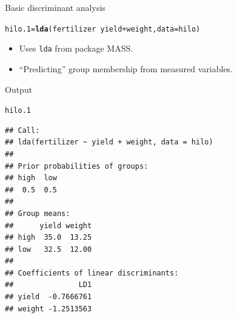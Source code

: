 \documentclass[unknownkeysallowed]{beamer}\usepackage[]{graphicx}\usepackage[]{color}
\makeatletter
\newcommand{\hlopt}[1]{\textcolor[rgb]{0,0,0}{#1}}%
\newcommand{\hlstd}[1]{\textcolor[rgb]{0.345,0.345,0.345}{#1}}%
\newcommand{\hlkwb}[1]{\textcolor[rgb]{0.69,0.353,0.396}{#1}}%
\newcommand{\hlkwc}[1]{\textcolor[rgb]{0.333,0.667,0.333}{#1}}%
\newcommand{\hlkwd}[1]{\textcolor[rgb]{0.737,0.353,0.396}{\textbf{#1}}}%
\newenvironment{kframe}{%
 \def\at@end@of@kframe{}%
 \ifinner\ifhmode%
  \def\at@end@of@kframe{\end{minipage}}%
  \begin{minipage}{\columnwidth}%
 \fi\fi%
 \def\FrameCommand##1{\hskip\@totalleftmargin \hskip-\fboxsep
 \colorbox{shadecolor}{##1}\hskip-\fboxsep
     \hskip-\linewidth \hskip-\@totalleftmargin \hskip\columnwidth}%
 \MakeFramed {\advance\hsize-\width
   \@totalleftmargin\z@ \linewidth\hsize
   \@setminipage}}%
 {\par\unskip\endMakeFramed%
 \at@end@of@kframe}
\newenvironment{knitrout}{}{} %
\makeatother
\begin{document}
\begin{frame}[fragile]{Basic discriminant analysis}

\begin{knitrout}
\color{fgcolor}\begin{kframe}
\begin{alltt}
\hlstd{hilo.1}\hlkwb{=}\hlkwd{lda}\hlstd{(fertilizer}\hlopt{~}\hlstd{yield}\hlopt{+}\hlstd{weight,}\hlkwc{data}\hlstd{=hilo)}
\end{alltt}
\end{kframe}
\end{knitrout}

\begin{itemize}
\item Uses \texttt{lda} from package MASS.
\item ``Predicting'' group membership from measured variables.
\end{itemize}

\end{frame}

\begin{frame}[fragile]{Output}

  
\begin{knitrout}\small
{}\color{fgcolor}\begin{kframe}
\begin{alltt}
\hlstd{hilo.1}
\end{alltt}
\begin{verbatim}
## Call:
## lda(fertilizer ~ yield + weight, data = hilo)
## 
## Prior probabilities of groups:
## high  low 
##  0.5  0.5 
## 
## Group means:
##      yield weight
## high  35.0  13.25
## low   32.5  12.00
## 
## Coefficients of linear discriminants:
##               LD1
## yield  -0.7666761
## weight -1.2513563
\end{verbatim}
\end{kframe}
\end{knitrout}

\end{frame}
\end{document}
